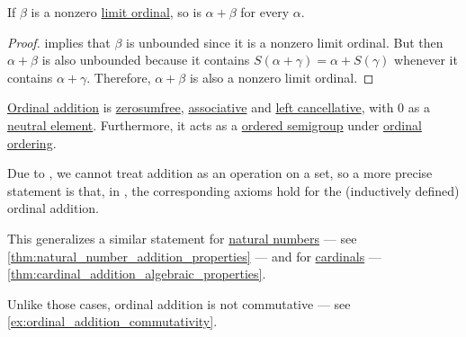 \begin{lemma}\label{thm:ordinal_addition_limit_ordinal}
  If \( \beta \) is a nonzero \hyperref[def:successor_and_limit_ordinal]{limit ordinal}, so is \( \alpha + \beta \) for every \( \alpha \).
\end{lemma}
\begin{proof}
   implies that \( \beta \) is unbounded since it is a nonzero limit ordinal. But then \( \alpha + \beta \) is also unbounded because it contains \( S(\alpha + \gamma) = \alpha + S(\gamma) \) whenever it contains \( \alpha + \gamma \). Therefore, \( \alpha + \beta \) is also a nonzero limit ordinal.
\end{proof}

\begin{proposition}\label{thm:ordinal_addition_algebraic_properties}
  \hyperref[def:ordinal_addition]{Ordinal addition} is \hyperref[def:zerosumfree]{zerosumfree}, \hyperref[def:binary_operation/associative]{associative} and \hyperref[def:binary_operation/cancellative]{left cancellative}, with \( 0 \) as a \hyperref[def:semigroup_neutral_element]{neutral element}. Furthermore, it acts as a \hyperref[def:ordered_semigroup]{ordered semigroup} under \hyperref[def:ordinal_ordering]{ordinal ordering}.
\end{proposition}
\begin{comments}
  \item Due to , we cannot treat addition as an operation on a set, so a more precise statement is that, in \hyperref[def:zfc]{}, the corresponding axioms hold for the (inductively defined) ordinal addition.

  \item This generalizes a similar statement for \hyperref[def:natural_numbers]{natural numbers} --- see \cref{thm:natural_number_addition_properties} --- and for \hyperref[def:cardinal]{cardinals} --- \cref{thm:cardinal_addition_algebraic_properties}.

  Unlike those cases, ordinal addition is not commutative --- see \cref{ex:ordinal_addition_commutativity}.
\end{comments}

